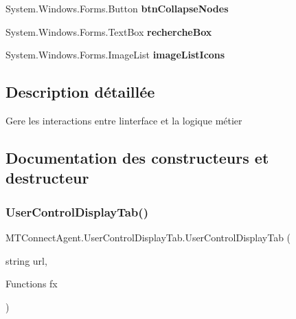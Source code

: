 \begin{DoxyCompactItemize}
System.\+Windows.\+Forms.\+Button {\bfseries btn\+Collapse\+Nodes}
\item 
\mbox{\label{class_m_t_connect_agent_1_1_user_control_display_tab_a789854421cf3f00de88bc6bf168e4ada}} 
System.\+Windows.\+Forms.\+Text\+Box {\bfseries recherche\+Box}
\item 
\mbox{\label{class_m_t_connect_agent_1_1_user_control_display_tab_a4e0ab361176edf2f0a3b1f7bf0fe4f5d}} 
System.\+Windows.\+Forms.\+Image\+List {\bfseries image\+List\+Icons}
\end{DoxyCompactItemize}


\subsection{Description détaillée}
Gere les interactions entre l\textquotesingle{}interface et la logique métier 



\subsection{Documentation des constructeurs et destructeur}
\mbox{\label{class_m_t_connect_agent_1_1_user_control_display_tab_a75f993d745781ea932a201f00bbe150e}} 
\subsubsection{\texorpdfstring{User\+Control\+Display\+Tab()}{UserControlDisplayTab()}}
{\footnotesize\ttfamily M\+T\+Connect\+Agent.\+User\+Control\+Display\+Tab.\+User\+Control\+Display\+Tab (\begin{DoxyParamCaption}\item[{string}]{url,  }\item[{Functions}]{fx }\end{DoxyParamCaption})\hspace{0.3cm}{\ttfamily [inline]}}



